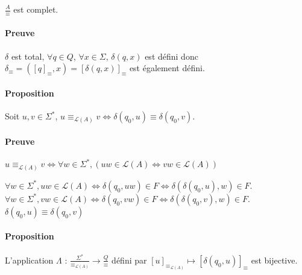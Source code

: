 $\frac{A}{\equiv}$ est complet.



\paragraph{Preuve} %
\label{par:preuve}

$\delta$ est total, $\forall q \in Q$, $\forall x \in \Sigma$, $\delta(q,x)$ est défini donc $\delta_{\equiv}=([q]_{\equiv},x) = [\delta(q,x)]_{\equiv}$ est également défini.



\paragraph{Proposition} %
\label{par:proposition}

Soit $u,v \in \Sigma^*$, $u \equiv_{\mathcal{L}(A)} v \Leftrightarrow \delta(q_0,u) \equiv \delta(q_0,v)$.



\paragraph{Preuve} %
\label{par:preuve}

$u \equiv_{\mathcal{L}(A)} v \Leftrightarrow \forall w \in \Sigma^*, (uw \in \mathcal{L}(A) \Leftrightarrow vw \in \mathcal{L}(A))$

$\forall w \in \Sigma^*, uw \in \mathcal{L}(A) \Leftrightarrow \delta(q_0,uw) \in F \Leftrightarrow \delta(\delta(q_0,u),w) \in F$.\\
$\forall w \in \Sigma^*, vw \in \mathcal{L}(A) \Leftrightarrow \delta(q_0,vw) \in F \Leftrightarrow \delta(\delta(q_0,v),w) \in F$.\\
$\delta(q_0,u) \equiv \delta(q_0,v)$



\paragraph{Proposition} %
\label{par:proposition}

L'application $\Lambda$ : $\frac{\Sigma^*}{\equiv_{\mathcal{L}(A)}} \rightarrow \frac{Q}{\equiv}$ défini par $[u]_{\equiv_{\mathcal{L}(A)}} \mapsto [\delta(q_0,u)]_{\equiv}$ est bijective.



